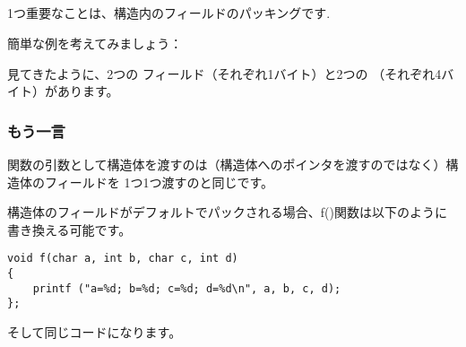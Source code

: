 ﻿\subsection{\StructurePackingSectionName}
\label{structure_packing}

1つ重要なことは、構造内のフィールドのパッキングです.

簡単な例を考えてみましょう：



見てきたように、2つの \Tchar フィールド（それぞれ1バイト）と2つの \Tint（それぞれ4バイト）があります。





\subsubsection{もう一言}

関数の引数として構造体を渡すのは（構造体へのポインタを渡すのではなく）構造体のフィールドを
1つ1つ渡すのと同じです。

構造体のフィールドがデフォルトでパックされる場合、f()関数は以下のように書き換える可能です。

\begin{lstlisting}[style=customc]
void f(char a, int b, char c, int d)
{
    printf ("a=%d; b=%d; c=%d; d=%d\n", a, b, c, d);
};
\end{lstlisting}

そして同じコードになります。
